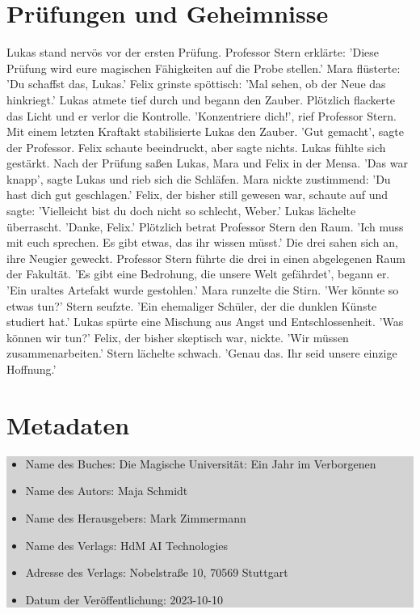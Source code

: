 \documentclass[12pt]{article}
\begin{document}
\section{ Prüfungen und Geheimnisse }
Lukas stand nervös vor der ersten Prüfung. Professor Stern erklärte: 'Diese Prüfung wird eure magischen Fähigkeiten auf die Probe stellen.' Mara flüsterte: 'Du schaffst das, Lukas.' Felix grinste spöttisch: 'Mal sehen, ob der Neue das hinkriegt.' Lukas atmete tief durch und begann den Zauber. Plötzlich flackerte das Licht und er verlor die Kontrolle. 'Konzentriere dich!', rief Professor Stern. Mit einem letzten Kraftakt stabilisierte Lukas den Zauber. 'Gut gemacht', sagte der Professor. Felix schaute beeindruckt, aber sagte nichts. Lukas fühlte sich gestärkt. Nach der Prüfung saßen Lukas, Mara und Felix in der Mensa. 'Das war knapp', sagte Lukas und rieb sich die Schläfen. Mara nickte zustimmend: 'Du hast dich gut geschlagen.' Felix, der bisher still gewesen war, schaute auf und sagte: 'Vielleicht bist du doch nicht so schlecht, Weber.' Lukas lächelte überrascht. 'Danke, Felix.' Plötzlich betrat Professor Stern den Raum. 'Ich muss mit euch sprechen. Es gibt etwas, das ihr wissen müsst.' Die drei sahen sich an, ihre Neugier geweckt. Professor Stern führte die drei in einen abgelegenen Raum der Fakultät. 'Es gibt eine Bedrohung, die unsere Welt gefährdet', begann er. 'Ein uraltes Artefakt wurde gestohlen.' Mara runzelte die Stirn. 'Wer könnte so etwas tun?' Stern seufzte. 'Ein ehemaliger Schüler, der die dunklen Künste studiert hat.' Lukas spürte eine Mischung aus Angst und Entschlossenheit. 'Was können wir tun?' Felix, der bisher skeptisch war, nickte. 'Wir müssen zusammenarbeiten.' Stern lächelte schwach. 'Genau das. Ihr seid unsere einzige Hoffnung.'

\clearpage

\section*{Metadaten}
\colorbox{lightgray}{
    \begin{minipage}{\dimexpr\textwidth-2\fboxsep}
        \vspace{1cm}
        \begin{itemize}
            \item Name des Buches: Die Magische Universität: Ein Jahr im Verborgenen
            \item Name des Autors: Maja Schmidt
            \item Name des Herausgebers: Mark Zimmermann
            \item Name des Verlags: HdM AI Technologies
            \item Adresse des Verlags: Nobelstraße 10, 70569 Stuttgart
            \item Datum der Veröffentlichung: 2023-10-10
        \end{itemize}
        \vspace{1cm}
    \end{minipage}
}
\end{document}

